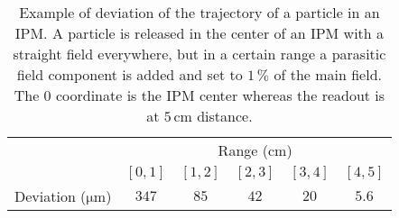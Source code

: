 \begin{table}[ht]
	\centering
	\caption[Example of deviation of the trajectory of a particle in an IPM]
	{Example of deviation of the trajectory of a particle in an IPM. A particle is released in the center of an IPM with a straight field everywhere, but in a certain range a parasitic field component is added and set to $1\,\mathrm{\%}$ of the main field. The 0 coordinate is the IPM center whereas the readout is at \(5 \, \mathrm{cm}\) distance.}
	\label{chap3:Deviation}
	\begin{tabular}{cccccc}
		\toprule
		                               & \multicolumn{5}{c}{Range (\(\mathrm{cm}\))}                                                 \\
		\cmidrule(lr){2-6}
		                               & \([0,1]\)                                   & \([1,2]\) & \([2,3]\) & \([3,4]\) & \([4,5]\) \\
		\midrule
		Deviation (\(\mathrm{\mu m}\)) & \(347\)                                     & \(85\)    & \(42\)    & \(20\)    & \(5.6\)   \\
		\bottomrule
	\end{tabular}
\end{table}